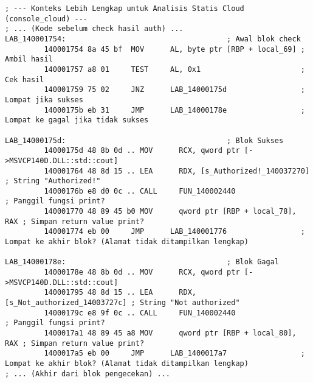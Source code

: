 \begin{verbatim}
; --- Konteks Lebih Lengkap untuk Analisis Statis Cloud (console_cloud) ---
; ... (Kode sebelum check hasil auth) ...
LAB_140001754:                                     ; Awal blok check
         140001754 8a 45 bf  MOV      AL, byte ptr [RBP + local_69] ; Ambil hasil
         140001757 a8 01     TEST     AL, 0x1                       ; Cek hasil
         140001759 75 02     JNZ      LAB_14000175d                 ; Lompat jika sukses
         14000175b eb 31     JMP      LAB_14000178e                 ; Lompat ke gagal jika tidak sukses

LAB_14000175d:                                     ; Blok Sukses
         14000175d 48 8b 0d .. MOV      RCX, qword ptr [->MSVCP140D.DLL::std::cout]
         140001764 48 8d 15 .. LEA      RDX, [s_Authorized!_140037270] ; String "Authorized!"
         14000176b e8 d0 0c .. CALL     FUN_140002440                 ; Panggil fungsi print?
         140001770 48 89 45 b0 MOV      qword ptr [RBP + local_78], RAX ; Simpan return value print?
         140001774 eb 00     JMP      LAB_140001776                 ; Lompat ke akhir blok? (Alamat tidak ditampilkan lengkap)

LAB_14000178e:                                     ; Blok Gagal
         14000178e 48 8b 0d .. MOV      RCX, qword ptr [->MSVCP140D.DLL::std::cout]
         140001795 48 8d 15 .. LEA      RDX, [s_Not_authorized_14003727c] ; String "Not authorized"
         14000179c e8 9f 0c .. CALL     FUN_140002440                 ; Panggil fungsi print?
         1400017a1 48 89 45 a8 MOV      qword ptr [RBP + local_80], RAX ; Simpan return value print?
         1400017a5 eb 00     JMP      LAB_1400017a7                 ; Lompat ke akhir blok? (Alamat tidak ditampilkan lengkap)
; ... (Akhir dari blok pengecekan) ...
    \end{verbatim}
\label{lst:asm_static_cloud_full}


